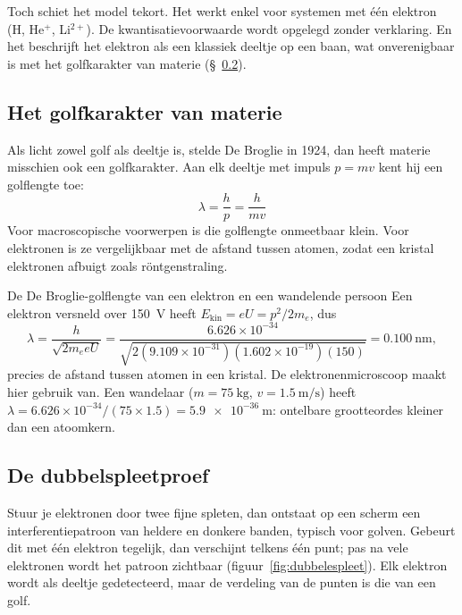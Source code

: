Toch schiet het model tekort. Het werkt enkel voor systemen met één elektron (H, He$^+$, Li$^{2+}$). De kwantisatievoorwaarde wordt opgelegd zonder verklaring. En het beschrijft het elektron als een klassiek deeltje op een baan, wat onverenigbaar is met het golfkarakter van materie (\S~\ref{sec:dubbelspleet}).

\subsection{Het golfkarakter van materie}

Als licht zowel golf als deeltje is, stelde De Broglie in 1924, dan heeft materie misschien ook een golfkarakter. Aan elk deeltje met impuls $p=mv$ kent hij een golflengte toe:
\begin{equation}
\boxed{
\lambda=\frac{h}{p}=\frac{h}{mv}
}
\end{equation}
Voor macroscopische voorwerpen is die golflengte onmeetbaar klein. Voor elektronen is ze vergelijkbaar met de afstand tussen atomen, zodat een kristal elektronen afbuigt zoals röntgenstraling.

\begin{voorbeeld}{De De Broglie-golflengte van een elektron en een wandelende persoon}
Een elektron versneld over \SI{150}{\volt} heeft $E_\mathrm{kin} = eU = p^2/2m_e$, dus
\[
\lambda = \frac{h}{\sqrt{2m_e eU}} = \frac{6.626\times10^{-34}}{\sqrt{2(9.109\times10^{-31})(1.602\times10^{-19})(150)}} = \SI{0.100}{\nano\metre},
\]
precies de afstand tussen atomen in een kristal. De elektronenmicroscoop maakt hier gebruik van. Een wandelaar ($m = \SI{75}{\kilo\gram}$, $v = \SI{1.5}{\metre\per\second}$) heeft $\lambda = 6.626\times10^{-34}/(75 \times 1.5) = \SI{5.9e-36}{\metre}$: ontelbare grootteordes kleiner dan een atoomkern.
\end{voorbeeld}

\subsection{De dubbelspleetproef}
\label{sec:dubbelspleet}

Stuur je elektronen door twee fijne spleten, dan ontstaat op een scherm een interferentiepatroon van heldere en donkere banden, typisch voor golven. Gebeurt dit met één elektron tegelijk, dan verschijnt telkens één punt; pas na vele elektronen wordt het patroon zichtbaar (figuur~\ref{fig:dubbelespleet}). Elk elektron wordt als deeltje gedetecteerd, maar de verdeling van de punten is die van een golf.

